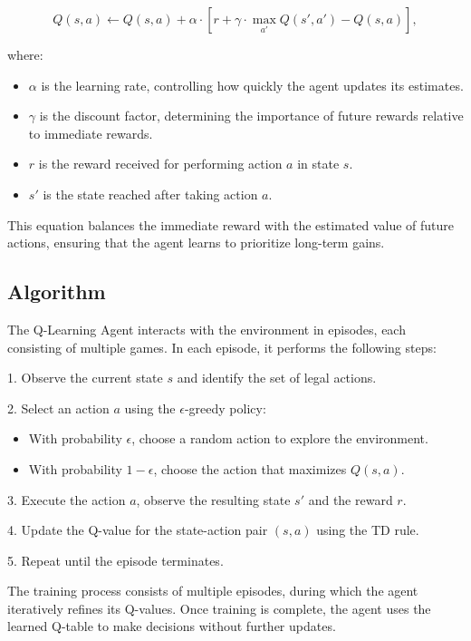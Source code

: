 \documentclass{article}
\begin{document}
\[
Q(s, a) \leftarrow Q(s, a) + \alpha \cdot \left[ r + \gamma \cdot \max_{a'} Q(s', a') - Q(s, a) \right],
\]

where:
\begin{itemize}
    \item $\alpha$ is the learning rate, controlling how quickly the agent updates its estimates.
    \item $\gamma$ is the discount factor, determining the importance of future rewards relative to immediate rewards.
    \item $r$ is the reward received for performing action $a$ in state $s$.
    \item $s'$ is the state reached after taking action $a$.
\end{itemize}

This equation balances the immediate reward with the estimated value of future actions, ensuring that the agent learns to prioritize long-term gains.

\subsection{Algorithm}

The Q-Learning Agent interacts with the environment in episodes, each consisting of multiple games. In each episode, it performs the following steps:

1. Observe the current state $s$ and identify the set of legal actions.

2. Select an action $a$ using the $\epsilon$-greedy policy:
   \begin{itemize}
       \item With probability $\epsilon$, choose a random action to explore the environment.
       \item With probability $1 - \epsilon$, choose the action that maximizes $Q(s, a)$.
   \end{itemize}
   
3. Execute the action $a$, observe the resulting state $s'$ and the reward $r$.

4. Update the Q-value for the state-action pair $(s, a)$ using the TD rule.

5. Repeat until the episode terminates.

The training process consists of multiple episodes, during which the agent iteratively refines its Q-values. Once training is complete, the agent uses the learned Q-table to make decisions without further updates.
\end{document}
